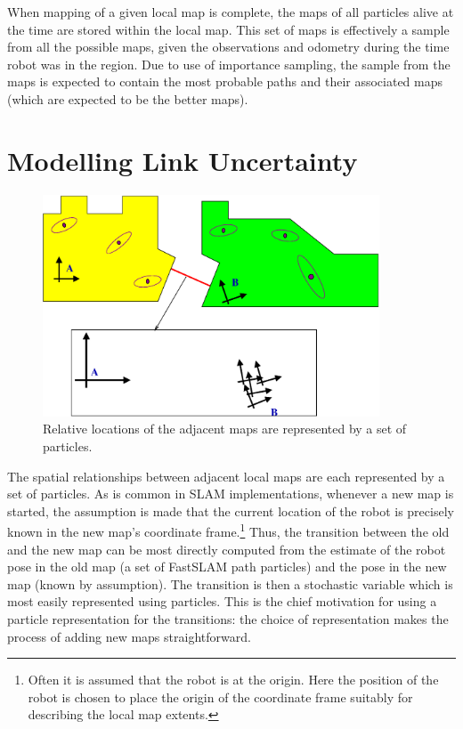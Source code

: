 When mapping of a given local map is complete, the maps of all
particles alive at the time are stored within the local map. This set
of maps is effectively a sample from all the possible maps, given the
observations and odometry during the time robot was in the region.
Due to use of importance sampling, the sample from the maps is
expected to contain the most probable paths and their associated maps
(which are expected to be the better maps).

\section{Modelling Link Uncertainty}
\label{sec:link}

\begin{figure}
\begin{center}
\includegraphics[width=10cm]{Pics/fig_transition_model}
\end{center}
\caption{Relative locations of the adjacent maps are represented by a
  set of particles.}
\end{figure}

The spatial relationships between adjacent local maps are each
represented by a set of particles.  As is common in SLAM
implementations, whenever a new map is started, the assumption is made
that the current location of the robot is precisely known in the new
map's coordinate frame.\footnote{Often it is assumed that the robot is
at the origin.  Here the position of the robot is chosen to place the
origin of the coordinate frame suitably for describing the local map
extents.} Thus, the transition between the old and the new map can be
most directly computed from the estimate of the robot pose in the old
map (a set of FastSLAM path particles) and the pose in the new map
(known by assumption). The transition is then a stochastic variable
which is most easily represented using particles. This is the chief
motivation for using a particle representation for the
transitions: the choice of representation makes the process of adding
new maps straightforward.

